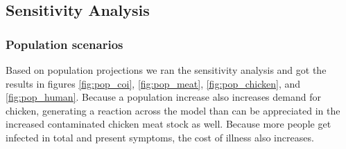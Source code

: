 \subsection{Sensitivity Analysis}
\subsubsection{Population scenarios}

Based on population projections \parencite{nidi_nidi_2020} we ran the sensitivity analysis and got the results in figures \ref{fig:pop_coi}, \ref{fig:pop_meat}, \ref{fig:pop_chicken}, and \ref{fig:pop_human}. Because a population increase also increases demand for chicken, generating a reaction across the model than can be appreciated in the increased contaminated chicken meat stock as well. Because more people get infected in total and present symptoms, the cost of illness also increases.

